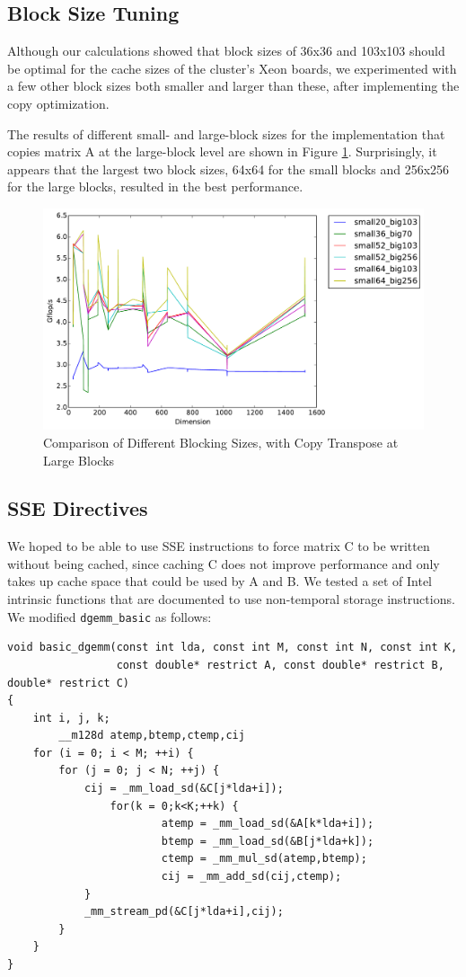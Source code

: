 \documentclass[letterpaper]{article}	 %
\begin{document}
\subsection{Block Size Tuning}
Although our calculations showed that block sizes of 36x36 and 103x103 should be optimal for the cache sizes of the cluster's Xeon boards, we experimented with a few other block sizes both smaller and larger than these, after implementing the copy optimization.

The results of different small- and large-block sizes for the implementation that copies matrix A at the large-block level are shown in Figure \ref{fig:l2blocking}. Surprisingly, it appears that the largest two block sizes, 64x64 for the small blocks and 256x256 for the large blocks, resulted in the best performance.

\begin{figure}[H]
\centering
  \centering
  \includegraphics[width=.6\linewidth]{timing-blocksizes-l2transpose.pdf}
  \caption{Comparison of Different Blocking Sizes, with Copy Transpose at Large Blocks}
  \label{fig:l2blocking}
\end{figure}


\subsection{SSE Directives}

We hoped to be able to use SSE instructions to force matrix C to be written without being cached, since caching C does not improve performance and only takes up cache space that could be used by A and B. We tested a set of Intel intrinsic functions that are documented to use non-temporal storage instructions. We modified \texttt{dgemm\_basic} as follows:

\begin{verbatim}
void basic_dgemm(const int lda, const int M, const int N, const int K,
                 const double* restrict A, const double* restrict B, double* restrict C)
{
    int i, j, k;
        __m128d atemp,btemp,ctemp,cij
    for (i = 0; i < M; ++i) {
        for (j = 0; j < N; ++j) {
            cij = _mm_load_sd(&C[j*lda+i]);
                for(k = 0;k<K;++k) {
                        atemp = _mm_load_sd(&A[k*lda+i]);
                        btemp = _mm_load_sd(&B[j*lda+k]);
                        ctemp = _mm_mul_sd(atemp,btemp);
                        cij = _mm_add_sd(cij,ctemp);
            }
            _mm_stream_pd(&C[j*lda+i],cij);
        }
    }
}
\end{verbatim}
\end{document}
